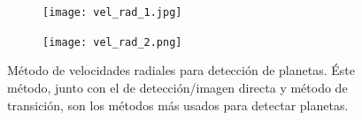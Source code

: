 \documentclass{article}
\begin{document}
\newpage

\begin{figure}
\centering
\begin{subfigure}[b]{0.75\textwidth}
   \texttt{[image: vel\_rad\_1.jpg]}
   \caption{}
   \label{fig:rad1} 
\end{subfigure}

\begin{subfigure}[b]{0.85\textwidth}
   \texttt{[image: vel\_rad\_2.png]}
   \caption{}
   \label{fig:rad2}
\end{subfigure}

\caption[Velocidades radiales]{Método de velocidades radiales para detección de planetas. Éste método, junto con el de detección/imagen directa y método de transición, son los métodos más usados para detectar planetas.}
\end{figure}
\end{document}
